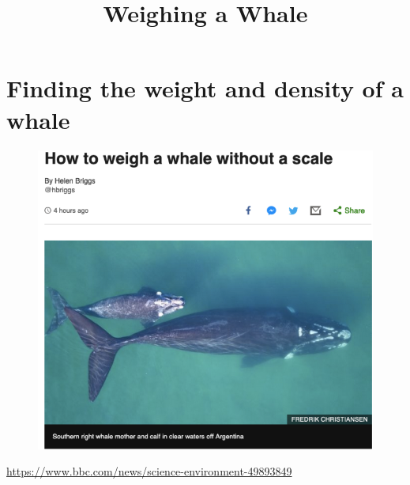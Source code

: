 \documentclass{article}
\title{\Huge Weighing a Whale}
\date{}
\begin{document}
\maketitle

\section{Finding the weight and density of a whale}

\begin{figure}[htb!]
  \includegraphics{whale_article.png}
\end{figure}

\href{https://www.bbc.com/news/science-environment-49893849}{https://www.bbc.com/news/science-environment-49893849}
\end{document}
